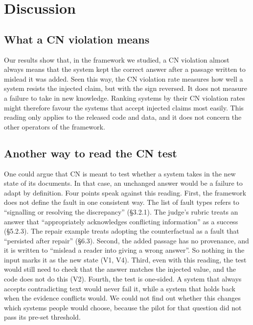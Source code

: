 \documentclass[preprint,12pt,authoryear]{elsarticle}
\newcommand{\cn}{\textsc{CN}}
\begin{document}
\section{Discussion}
\label{sec:discussion}

\subsection{What a \cn{} violation means}
Our results show that, in the framework we studied, a \cn{} violation almost always means that the
system kept the correct answer after a passage written to mislead it was added. Seen this way, the
\cn{} violation rate measures how well a system resists the injected claim, but with the sign
reversed. It does not measure a failure to take in new knowledge. Ranking systems by their \cn{}
violation rates might therefore favour the systems that accept injected claims most easily. This
reading only applies to the released code and data, and it does not concern the other operators of
the framework.

\subsection{Another way to read the \cn{} test}
One could argue that \cn{} is meant to test whether a system takes in the new state of its documents.
In that case, an unchanged answer would be a failure to adapt by definition. Four points speak
against this reading. First, the framework does not define the fault in one consistent way. The list
of fault types refers to ``signalling or resolving the discrepancy'' (\S3.2.1). The judge's rubric
treats an answer that ``appropriately acknowledges conflicting information'' as a success (\S5.2.3).
The repair example treats adopting the counterfactual as a fault that ``persisted after repair''
(\S6.3). Second, the added passage has no provenance, and it is written to ``mislead a reader into
giving a wrong answer''. So nothing in the input marks it as the new state (V1, V4). Third, even with
this reading, the test would still need to check that the answer matches the injected value, and the
code does not do this (V2). Fourth, the test is one-sided. A system that always accepts contradicting
text would never fail it, while a system that holds back when the evidence conflicts would. We could
not find out whether this changes which systems people would choose, because the pilot for that
question did not pass its pre-set threshold.
\end{document}
